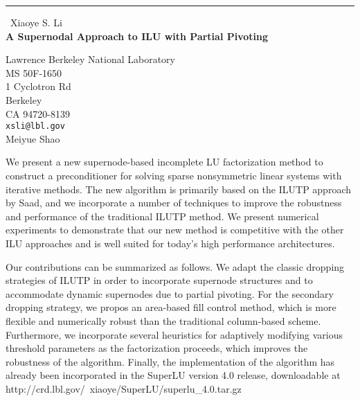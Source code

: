\documentclass{report}
\begin{document}
\begin{center}
\rule{6in}{1pt} \
{\large Xiaoye S. Li \\
{\bf A Supernodal Approach to ILU with Partial Pivoting}}

Lawrence Berkeley National Laboratory \\ MS 50F-1650 \\ 1 Cyclotron Rd \\ Berkeley \\ CA 94720-8139
\\
{\tt xsli@lbl.gov}\\
Meiyue Shao\end{center}

We present a new supernode-based incomplete LU factorization method
to construct a preconditioner for solving sparse nonsymmetric linear
systems with iterative methods. The new algorithm is primarily based
on the ILUTP approach by Saad, and we incorporate a number of
techniques to improve the robustness and performance of the
traditional ILUTP method. We present numerical experiments to
demonstrate that our new method is competitive with the other ILU
approaches and is well suited for today's high performance architectures.

Our contributions can be summarized as follows. We adapt the classic
dropping strategies of ILUTP in order to incorporate supernode
structures and to accommodate dynamic supernodes due to partial
pivoting. For the secondary dropping strategy, we propos an
area-based fill control method, which is more flexible and numerically
robust than the traditional column-based scheme. Furthermore, we
incorporate several heuristics for adaptively modifying various
threshold parameters as the factorization proceeds, which improves
the robustness of the algorithm. Finally, the implementation of the
algorithm has already been incorporated in the SuperLU version 4.0
release, downloadable at
http://crd.lbl.gov/~xiaoye/SuperLU/superlu_4.0.tar.gz
\end{document}
